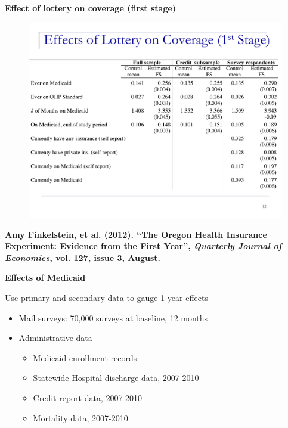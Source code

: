 \documentclass[notes=show]{beamer}
\begin{document}
\begin{frame}[plain]
	\begin{center}
	\textbf{Effect of lottery on coverage (first stage)}
	\end{center}
	
	\begin{figure}
	\includegraphics[scale=0.35]{./lecture_includes/baicker_2.pdf}
	\end{figure}
\end{frame}


\begin{frame}[plain]
	\begin{center}
	\textbf{Amy Finkelstein, et al. (2012). ``The Oregon Health Insurance Experiment: Evidence from the First Year'', \emph{Quarterly Journal of Economics}, vol. 127, issue 3, August. }
	\end{center}
\end{frame}

\begin{frame}[plain]	
	\begin{center}
	\textbf{Effects of Medicaid}
	\end{center}
	
 Use primary and secondary data to gauge 1-year effects
		\begin{itemize}
		\item Mail surveys: 70,000 surveys at baseline, 12 months
		\item Administrative data
			\begin{itemize}
			\item Medicaid enrollment records
			\item Statewide Hospital discharge data, 2007-2010
			\item Credit report data, 2007-2010
			\item Mortality data, 2007-2010
			\end{itemize}
		\end{itemize}
\end{frame}
\end{document}
